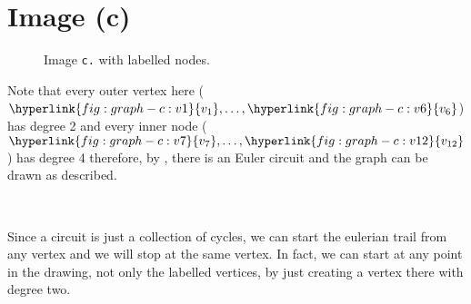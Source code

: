 \section{Image (c)}

\noindent
\begin{minipage}[t]{0.6\textwidth}

    \begin{figure}[H]
        \centering
        

        \caption{Image \texttt{c.} with labelled nodes.}
        \label{fig:graph-c}
    \end{figure}

\end{minipage}%
\begin{minipage}[t]{0.39\textwidth}

    Note that every outer vertex here ($\hyperlink{fig:graph-c:v1}{v_1}, \ldots, \hyperlink{fig:graph-c:v6}{v_6}$) has degree 2 and every inner node ($\hyperlink{fig:graph-c:v7}{v_7}, \ldots, \hyperlink{fig:graph-c:v12}{v_{12}}$) has degree 4 therefore, by , there is an Euler circuit and the graph can be drawn as described.

    ~

    \indent Since a circuit is just a collection of cycles, we can start the eulerian trail from any vertex and we will stop at the same vertex. In fact, we can start at any point in the drawing, not only the labelled vertices, by just creating a vertex there with degree two.

\end{minipage}

